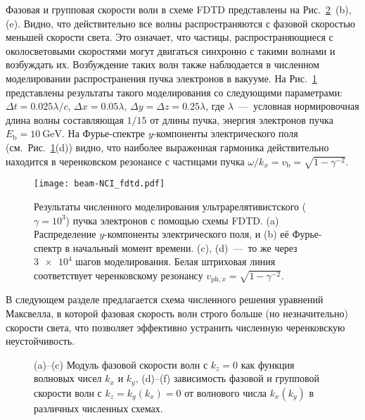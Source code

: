 Фазовая и групповая скорости волн в схеме FDTD представлены на Рис.~\ref{fig:ch3/sec4/vphFP}~(b), (e).
Видно, что действительно все волны распространяются с фазовой скоростью меньшей скорости света.
Это означает, что частицы, распространяющиеся с околосветовыми скоростями могут двигаться синхронно с такими волнами и возбуждать их.
Возбуждение таких волн также наблюдается в численном моделировании распространения пучка электронов в вакууме.
На Рис.~\ref{fig:ch3/sec4/FDTD_NCI} представлены результаты такого моделирования со следующими параметрами: $\Delta t = 0.025 \lambda/c$, $\Delta x = 0.05  \lambda$, $\Delta y = \Delta z = 0.25\lambda$, где $\lambda$~---~условная нормировочная длина волны составляющая $1/15$ от длины пучка, энергия электронов пучка $E_\mathrm{b} = \SI{10}{\giga\electronvolt}$.
На Фурье-спектре $y$-компоненты электрического поля (см.~Рис.~\ref{fig:ch3/sec4/FDTD_NCI}\;(d)) видно, что наиболее выраженная гармоника действительно находится в черенковском резонансе с частицами пучка $\omega/k_x = v_\mathrm{b} = \sqrt{1-\gamma^{-2}}$.

\begin{figure}[ht]
	\texttt{[image: beam-NCI\_fdtd.pdf]} 
	\caption[Результаты численного моделирования ультрарелятивистского ($\gamma=10^3$) пучка электронов с помощью схемы FDTD]{\label{fig:ch3/sec4/FDTD_NCI} Результаты численного моделирования ультрарелятивистского ($\gamma = 10^3$) пучка электронов с помощью схемы FDTD. (a) Распределение $y$-компоненты электрического поля, и (b) её Фурье-спектр в начальный момент времени. (c), (d)~---~то же через $\num{3e4}$ шагов моделирования. Белая штриховая линия соответствует черенковскому резонансу $v_{\mathrm{ph}, x} = \sqrt{1 - \gamma^{-2}}$.}
\end{figure}

В следующем разделе предлагается схема численного решения уравнений Максвелла, в которой фазовая скорость волн строго больше (но незначительно) скорости света, что позволяет эффективно устранить численную черенковскую неустойчивость.

\begin{figure}[ht]
    \caption[Фазовая и групповая скорость волн в вакууме в различных численных схемах]{(a)--(c) Модуль фазовой скорости волн с $k_z=0$ как функция волновых чисел $k_x$ и $k_y$, (d)--(f) зависимость фазовой и групповой скорости волн с $k_z=k_y (k_x)=0$ от волнового числа $k_x (k_y)$ в различных численных схемах.
    \label{fig:ch3/sec4/vphFP}}
\end{figure}

